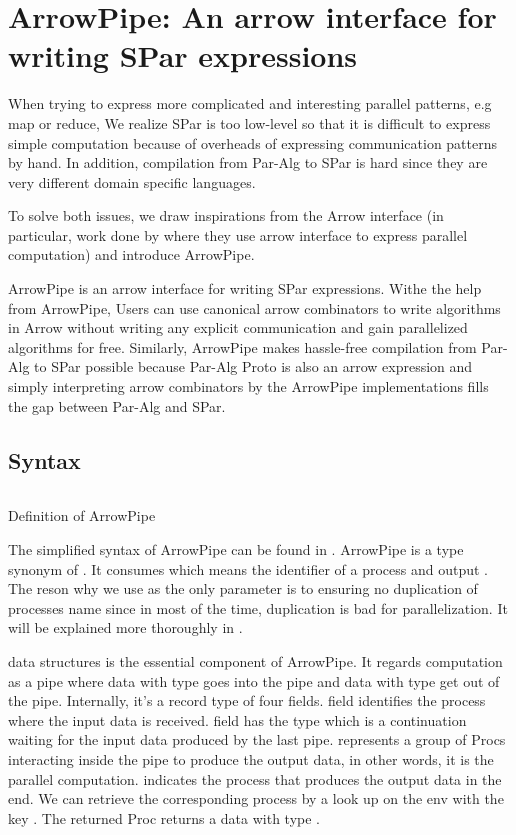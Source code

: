 \chapter{ArrowPipe: An arrow interface for writing SPar expressions}
When trying to express more complicated and interesting parallel patterns, e.g map or reduce, We realize SPar is too low-level so that it is difficult to express simple computation because of overheads of expressing communication patterns by hand. In addition, compilation from Par-Alg to SPar is hard since they are very different domain specific languages. 

To solve both issues, we draw inspirations from the Arrow interface (in particular, work done by \cite{braunArrowsParallelComputation2018} where they use arrow interface to express parallel computation) and introduce ArrowPipe.

ArrowPipe is an arrow interface for writing SPar expressions. Withe the help from ArrowPipe, Users can use canonical arrow combinators to write algorithms in Arrow without writing any explicit communication and gain parallelized algorithms for free. Similarly, ArrowPipe makes hassle-free compilation from Par-Alg to SPar possible because Par-Alg Proto is also an arrow expression and simply interpreting arrow combinators by the ArrowPipe implementations fills the gap between Par-Alg and SPar. 

\section{Syntax}
\begin{listing}[ht]
\inputminted{Haskell}{arrow/def.hs} %
\caption{Definition of ArrowPipe}
\label{arrowPipe:def}
\end{listing}
The simplified syntax of ArrowPipe can be found in . ArrowPipe is a type synonym of . It consumes  which means the identifier of a process and output . The reson why we use  as the only parameter is to ensuring no duplication of processes name since in most of the time, duplication is bad for parallelization. It will be explained more thoroughly in .

 data structures is the essential component of ArrowPipe. It regards computation as a pipe where data with type  goes into the pipe and data with type  get out of the pipe. Internally, it's a record type of four fields.  field identifies the process where the input data is received.  field has the type  which is a continuation waiting for the input data produced by the last pipe.  represents a group of Procs interacting inside the pipe to produce the output data, in other words, it is the parallel computation.  indicates the process that produces the output data in the end. We can retrieve the corresponding process by a look up on the env with the key . The returned Proc returns a data with type .
